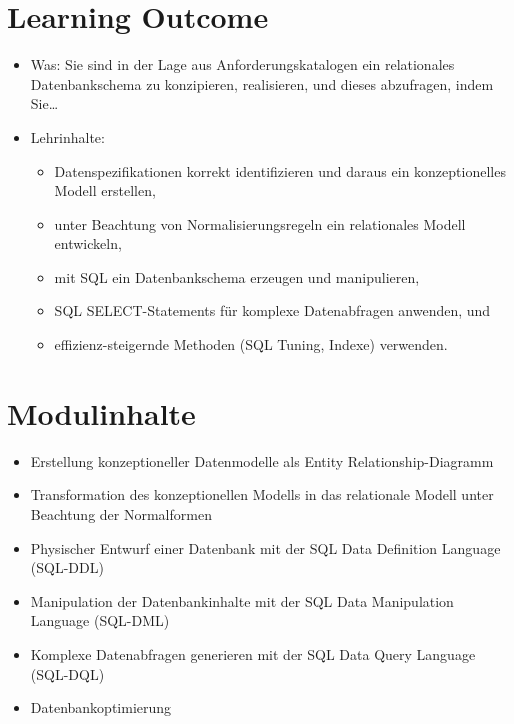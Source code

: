 \hypertarget{learning-outcomepathlabel....srcmodulbeschreibungen-bachelor-bpo5ba_datenbanksysteme}{%
\section*{Learning
Outcome\label{../../src/modulbeschreibungen-bachelor-bpo5/BA_Datenbanksysteme}}\label{learning-outcomepathlabel....srcmodulbeschreibungen-bachelor-bpo5ba_datenbanksysteme}}

\begin{itemize}
\tightlist
\item
  Was: Sie sind in der Lage aus Anforderungskatalogen ein relationales
  Datenbankschema zu konzipieren, realisieren, und dieses abzufragen,
  indem Sie\ldots{}
\item
  Lehrinhalte:

  \begin{itemize}
\tightlist
\item
    Datenspezifikationen korrekt identifizieren und daraus ein
    konzeptionelles Modell erstellen,
  \item
    unter Beachtung von Normalisierungsregeln ein relationales Modell
    entwickeln,
  \item
    mit SQL ein Datenbankschema erzeugen und manipulieren,
  \item
    SQL SELECT-Statements für komplexe Datenabfragen anwenden, und
  \item
    effizienz-steigernde Methoden (SQL Tuning, Indexe) verwenden.
  \end{itemize}
\end{itemize}

\hypertarget{modulinhaltepathlabel....srcmodulbeschreibungen-bachelor-bpo5ba_datenbanksysteme}{%
\section*{Modulinhalte\label{../../src/modulbeschreibungen-bachelor-bpo5/BA_Datenbanksysteme}}\label{modulinhaltepathlabel....srcmodulbeschreibungen-bachelor-bpo5ba_datenbanksysteme}}

\begin{itemize}
\tightlist
\item
  Erstellung konzeptioneller Datenmodelle als Entity
  Relationship-Diagramm
\item
  Transformation des konzeptionellen Modells in das relationale Modell
  unter Beachtung der Normalformen
\item
  Physischer Entwurf einer Datenbank mit der SQL Data Definition
  Language (SQL-DDL)
\item
  Manipulation der Datenbankinhalte mit der SQL Data Manipulation
  Language (SQL-DML)
\item
  Komplexe Datenabfragen generieren mit der SQL Data Query Language
  (SQL-DQL)
\item
  Datenbankoptimierung
\end{itemize}

